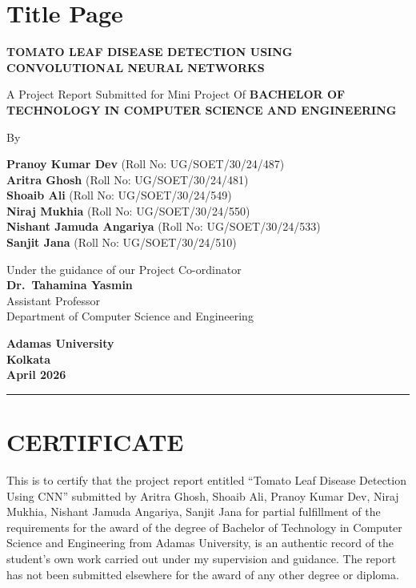 \documentclass[
]{article}
\author{}
\date{}
\begin{document}
{
\setcounter{tocdepth}{3}
\tableofcontents
}
\section{Title Page}\label{title-page}

\textbf{TOMATO LEAF DISEASE DETECTION USING CONVOLUTIONAL NEURAL
NETWORKS}

A Project Report Submitted for Mini Project Of \textbf{BACHELOR OF
TECHNOLOGY IN COMPUTER SCIENCE AND ENGINEERING}

By

\textbf{Pranoy Kumar Dev} (Roll No: UG/SOET/30/24/487)\\
\textbf{Aritra Ghosh} (Roll No: UG/SOET/30/24/481)\\
\textbf{Shoaib Ali} (Roll No: UG/SOET/30/24/549)\\
\textbf{Niraj Mukhia} (Roll No: UG/SOET/30/24/550)\\
\textbf{Nishant Jamuda Angariya} (Roll No: UG/SOET/30/24/533)\\
\textbf{Sanjit Jana} (Roll No: UG/SOET/30/24/510)

Under the guidance of our Project Co-ordinator\\
\textbf{Dr.~Tahamina Yasmin}\\
Assistant Professor\\
Department of Computer Science and Engineering

\textbf{Adamas University}\\
\textbf{Kolkata}\\
\textbf{April 2026}

\begin{center}\rule{0.5\linewidth}{0.5pt}\end{center}

\section{CERTIFICATE}\label{certificate}

This is to certify that the project report entitled ``Tomato Leaf
Disease Detection Using CNN'' submitted by Aritra Ghosh, Shoaib Ali,
Pranoy Kumar Dev, Niraj Mukhia, Nishant Jamuda Angariya, Sanjit Jana for
partial fulfillment of the requirements for the award of the degree of
Bachelor of Technology in Computer Science and Engineering from Adamas
University, is an authentic record of the student's own work carried out
under my supervision and guidance. The report has not been submitted
elsewhere for the award of any other degree or diploma.
\end{document}
